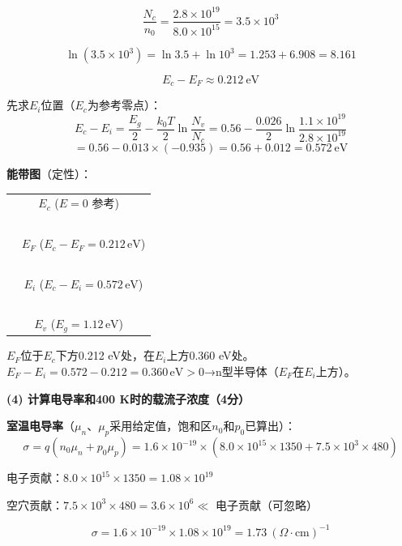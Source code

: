 \documentclass[12pt,a4paper]{ctexart}
\begin{document}
\[
\frac{N_c}{n_0} = \frac{2.8 \times 10^{19}}{8.0 \times 10^{15}} = 3.5 \times 10^3
\]

\[
\ln(3.5 \times 10^3) = \ln 3.5 + \ln 10^3 = 1.253 + 6.908 = 8.161
\]

\[
\boxed{E_c - E_F \approx 0.212\ \text{eV}}
\]

先求$E_i$位置（$E_c$为参考零点）：
\[
E_c - E_i = \frac{E_g}{2} - \frac{k_0T}{2}\ln\frac{N_v}{N_c}
= 0.56 - \frac{0.026}{2} \ln\frac{1.1\times10^{19}}{2.8\times10^{19}}
\]
\[
= 0.56 - 0.013 \times (-0.935) = 0.56 + 0.012 = 0.572\ \text{eV}
\]

\textbf{能带图}（定性）：
\begin{center}
\begin{tabular}{c}
$E_c$ \hspace{2cm} ($E=0$ 参考) \\
\ \\
\ \hspace{1.5cm} $E_F$ \hspace{0.5cm} ($E_c - E_F = 0.212\,\text{eV}$) \\
\ \\
\ \hspace{1.5cm} $E_i$ \hspace{0.5cm} ($E_c - E_i = 0.572\,\text{eV}$) \\
\ \\
$E_v$ \hspace{2cm} ($E_g = 1.12\,\text{eV}$) \\
\end{tabular}
\end{center}

$E_F$位于$E_c$下方0.212 eV处，在$E_i$上方0.360 eV处。$E_F - E_i = 0.572 - 0.212 = 0.360\,\text{eV} > 0$→n型半导体（$E_F$在$E_i$上方）。

\vspace{6pt}

\noindent\textbf{(4) 计算电导率和400 K时的载流子浓度（4分）}

\textbf{室温电导率}（$\mu_n$、$\mu_p$采用给定值，饱和区$n_0$和$p_0$已算出）：
\[
\sigma = q(n_0\mu_n + p_0\mu_p)
= 1.6\times10^{-19} \times (8.0\times10^{15}\times1350 + 7.5\times10^{3}\times480)
\]

电子贡献：$8.0\times10^{15} \times 1350 = 1.08\times10^{19}$

空穴贡献：$7.5\times10^{3} \times 480 = 3.6\times10^{6} \ll$ 电子贡献（可忽略）

\[
\sigma = 1.6\times10^{-19} \times 1.08\times10^{19}
= 1.73\ (\Omega\cdot\text{cm})^{-1}
\]
\end{document}
